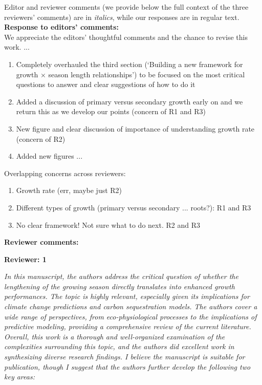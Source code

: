\documentclass[11pt]{article}
\begin{document}
\setlength{\parindent}{0cm}
\setlength{\parskip}{7pt}


\renewcommand{\refname}{\CHead{}}

Editor and reviewer comments (we provide below the full context of the three reviewers' comments) are in \emph{italics}, while our responses are in regular text. \\ 

{\bf Response to editors' comments:} \\  %

We appreciate the editors' thoughtful comments and the chance to revise this work. ...

\begin{enumerate}
\item Completely overhauled the third section (`Building a new framework for growth × season length relationships') to be focused on the most critical questions to answer and clear suggestions of how to do it
\item Added a discussion of primary versus secondary growth early on and we return this as we develop our points  (concern of R1 and R3) 
\item New figure and clear discussion of importance of understanding growth rate (concern of R2) 
\item Added new figures ... 
\end{enumerate}

Overlapping concerns across reviewers:
\begin{enumerate}
\item Growth rate (err, maybe just R2) 
\item Different types of growth (primary versus secondary ... roots?):  R1 and R3
\item No clear framework! Not sure what to do next. R2 and R3 
\end{enumerate}

{\bf Reviewer comments:} 

{\bf Reviewer: 1}


\emph{In this manuscript, the authors address the critical question of whether the lengthening of the growing season directly translates into enhanced growth performances. The topic is highly relevant, especially given its implications for climate change predictions and carbon sequestration models. The authors cover a wide range of perspectives, from eco-physiological processes to the implications of predictive modeling, providing a comprehensive review of the current literature. Overall, this work is a thorough and well-organized examination of the complexities surrounding this topic, and the authors did excellent work in synthesizing diverse research findings. I believe the manuscript is suitable for publication, though I suggest that the authors further develop the following two key areas:}
\end{document}
